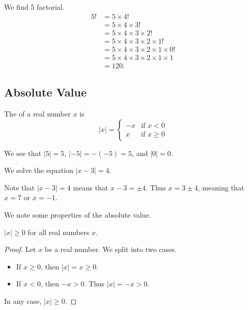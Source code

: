 \begin{example}
    We find 5 factorial.
    \begin{align*}
        5! &= 5 \times 4!\\
        &= 5 \times 4 \times 3!\\
        &= 5 \times 4 \times 3 \times 2!\\
        &= 5 \times 4 \times 3 \times 2 \times 1!\\
        &= 5 \times 4 \times 3 \times 2 \times 1 \times 0!\\
        &= 5 \times 4 \times 3 \times 2  \times 1  \times 1\\
        &= 120.
    \end{align*}
\end{example}

\subsection{Absolute Value}
\begin{definition}
    The  of a real number $x$ is
    \[
        |x| = \begin{cases}
            -x & \text{if } x < 0\\
            x & \text{if } x \geq 0
        \end{cases}
    \]
\end{definition}

\begin{example}
    We see that $|5| = 5$, $|-5| = -(-5) = 5$, and $|0| = 0$.
\end{example}

\begin{example}
    We solve the equation $|x-3| = 4$.

    Note that $|x-3| = 4$ means that $x-3 = \pm 4$. Thus $x = 3 \pm 4$, meaning that $x = 7$ or $x = -1$.
\end{example}

We note some properties of the absolute value.
\begin{proposition}
    $|x| \geq 0$ for all real numbers $x$.
\end{proposition}
\begin{proof}
    Let $x$ be a real number. We split into two cases.
    \begin{itemize}
        \item If $x \geq 0$, then $|x| = x \geq 0$.
        \item If $x < 0$, then $-x > 0$. Thus $|x| = -x > 0$.
    \end{itemize}
    In any case, $|x| \geq 0$.
\end{proof}

